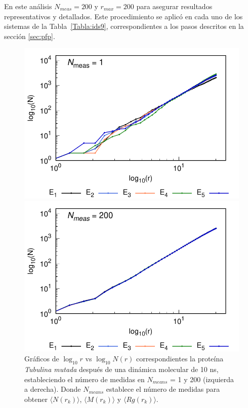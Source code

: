 	En este an\'{a}lisis $N_{meas} = 200 $ y $r_{max} = 200$ para asegurar resultados 
	representativos y detallados. Este procedimiento se aplic\'{o} en cada uno 
	de los sistemas de la Tabla~\ref{Tabla:ids9}, correspondientes a 
	los pasos descritos en la secci\'{o}n \ref{sec:pfp}.
	

	\begin{figure}[H]
		\hspace{-0.3cm} 
		\begin{minipage}{0.49\textwidth}
			\centering
			\includegraphics[width=\linewidth,page=1]{graphs/PDBs/Tubb4/TubMutA=1.pdf}
		\end{minipage}
		\hspace{0.2cm}
		\begin{minipage}{0.49\textwidth}
			\centering
			\includegraphics[width=\linewidth,page=1]{graphs/PDBs/Tubb4/TubMutA=200.pdf}
		\end{minipage}
		
		\caption{
			Gr\'{a}ficos de $\log_{10}r$ vs $\log_{10}N(r)$ correspondientes la prote\'{i}na \textit{Tubulina mutada} despu\'{e}s de una din\'{a}mica molecular de 10 ns, estableciendo el n\'{u}mero de medidas en  $N_{means}$ = 1 y 200 (izquierda a derecha). Donde $N_{means}$ establece el n\'{u}mero de medidas para obtener $\langle N(r_k) \rangle$, $\langle M(r_k) \rangle$ y $\langle Rg(r_k) \rangle$.}
		\label{fig:Nmeasp}
	\end{figure}
	
